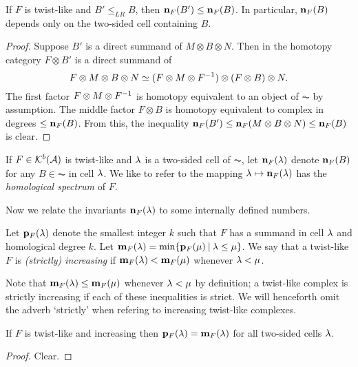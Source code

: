 \begin{lemma}\label{lemma:tailProperty}
If $F$ is twist-like and $B'\leq_{LR} B$, then ${\mathbf n}_F(B')\leq {\mathbf n}_F(B)$.  In particular, ${\mathbf n}_F(B)$ depends only on the two-sided cell containing $B$.
\end{lemma}

\begin{proof}
Suppose $B'$ is a direct summand of $M\otimes B\otimes N$.  Then in the homotopy category $F\otimes B'$ is a direct summand of
\[
F\otimes M\otimes B\otimes N \simeq (F\otimes M\otimes F^{-1}) \otimes  (F\otimes B)\otimes N. 
\]
The first factor $F\otimes M\otimes F^{-1}$ is homotopy equivalent to an object of $\AC$ by assumption.  The middle factor $F\otimes B$ is homotopy equivalent to complex in degrees $\leq {\mathbf n}_F(B)$.  From this, the inequality ${\mathbf n}_F(B')\leq {\mathbf n}_F(M\otimes B\otimes N)\leq {\mathbf n}_F(B)$ is clear.
\end{proof}


\begin{definition}\label{def:n}
If $F\in {\mathcal{K}}^b({\mathcal{A}})$ is twist-like and $\lambda$ is a two-sided cell of $\AC$, let ${\mathbf n}_F(\lambda)$ denote ${\mathbf n}_F(B)$ for any $B\in \AC$ in cell $\lambda$.  We like to refer to the mapping $\lambda\mapsto {\mathbf n}_F(\lambda)$ has the \emph{homological spectrum} of $F$. 
\end{definition}
Now we relate the invariants ${\mathbf n}_F(\lambda)$ to some internally defined numbers.

\begin{definition}\label{def:m}
Let ${\mathbf p}_F(\lambda)$ denote the smallest integer $k$ such that $F$ has a summand in cell $\lambda$ and homological degree $k$.  Let ${\mathbf m}_F(\lambda)=\operatorname{min}\{{\mathbf p}_F(\mu)\:|\: \lambda\leq \mu\}$.  We say that a twist-like $F$ is \emph{(strictly) increasing} if ${\mathbf m}_F(\lambda)<{\mathbf m}_F(\mu)$ whenever $\lambda<\mu$.
\end{definition}
Note that ${\mathbf m}_F(\lambda)\le{\mathbf m}_F(\mu)$ whenever $\lambda < \mu$ by definition; a twist-like complex is strictly increasing if each of these inequalities is strict.  We will henceforth omit the adverb `strictly' when refering to increasing twist-like complexes.

\begin{lemma}
If $F$ is twist-like and increasing then ${\mathbf p}_F(\lambda)={\mathbf m}_F(\lambda)$ for all two-sided cells $\lambda$.
\end{lemma}
\begin{proof}
Clear.
\end{proof}





